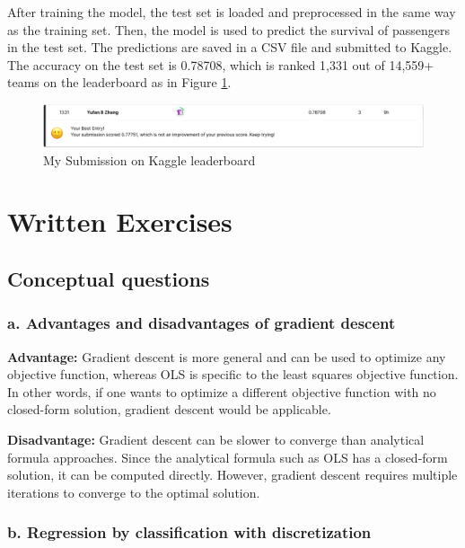 \documentclass[10pt]{article}
\begin{document}
After training the model, the test set is loaded and preprocessed in the same way as the training set. Then, the model is used to predict the survival of passengers in the test set. The predictions are saved in a CSV file and submitted to Kaggle. The accuracy on the test set is 0.78708, which is ranked 1,331 out of 14,559+ teams on the leaderboard as in Figure \ref{fig:kaggle_leaderboard}.

\begin{figure}[!htbp]
    \centering
    \includegraphics[width=\textwidth]{../hw1/result/Part_II/leaderboard.png}
    \caption{My Submission on Kaggle leaderboard}
    \label{fig:kaggle_leaderboard}
\end{figure}

\section{Written Exercises}

\subsection{Conceptual questions}

\subsubsection*{a. Advantages and disadvantages of gradient descent}

\textbf{Advantage:} Gradient descent is more general and can be used to optimize any objective function, whereas OLS is specific to the least squares objective function. In other words, if one wants to optimize a different objective function with no closed-form solution, gradient descent would be applicable.
    
\textbf{Disadvantage:} Gradient descent can be slower to converge than analytical formula approaches. Since the analytical formula such as OLS has a closed-form solution, it can be computed directly. However, gradient descent requires multiple iterations to converge to the optimal solution.

\subsubsection*{b. Regression by classification with discretization}
\end{document}
